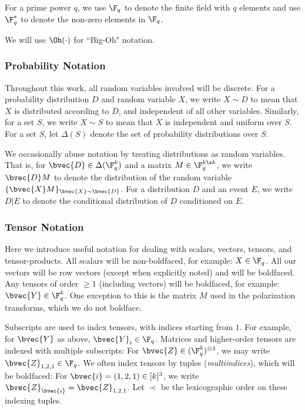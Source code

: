 \documentclass[11pt]{article}
\begin{document}
For a prime power $q$, we use $\F_q$ to denote the finite field with $q$ elements and use $\F_q^*$ to denote the non-zero elements in $\F_q$.

We will use $\Oh(\cdot)$ for ``Big-Oh" notation.

\subsubsection{Probability Notation}

Throughout this work, all random variables involved will be discrete.
For a probability distribution $D$ and random variable $X$, we write $X \sim D$ to mean that
$X$ is distributed according to $D$, and independent of all other variables.
Similarly, for a set $S$, we write $X \sim S$ to mean that $X$ is
independent and uniform over $S$.
For a set $S$, let $\Delta(S)$ denote the set of probability distributions over $S$.

We occasionally abuse notation by treating distributions as random variables.
That is, for $\bvec{D} \in \Delta(\F_q^k)$ and a matrix $M \in \F_q^{k \x k}$,
we write $\bvec{D}M$ to denote the distribution of the random variable
$\{\bvec{X}M\}_{\bvec{X} \sim \bvec{D}}$.
For a distribution $D$ and an event $E$, we write $D | E$ to denote the
conditional distribution of $D$ conditioned on $E$.

\subsubsection{Tensor Notation}
\label{sec:notation}
Here we introduce useful notation for dealing with scalars, vectors, tensors, and tensor-products.
All scalars will be non-boldfaced, for example: $X \in \F_q$.
All our vectors will be row vectors (except when explicitly noted) and will be boldfaced.
Any tensors of order $\geq 1$ (including vectors) will be boldfaced, for example: $\bvec{Y} \in \F_q^{k}$.
One exception to this is the matrix $M$ used in the polarization transforms,
which we do not boldface.

Subscripts are used to index tensors, with indices starting from $1$.
For example, for $\bvec{Y}$ as above, $\bvec{Y}_i \in \F_q$.
Matrices and higher-order tensors are indexed with multiple subscripts:
For $\bvec{Z} \in (\F_q^k)^{\otimes 3}$,
we may write $\bvec{Z}_{1, 2, 1} \in \F_q$.
We often index tensors by tuples (\emph{multiindices}), which will be boldfaced:
For $\bvec{i} = (1, 2, 1) \in [k]^3$, we write $\bvec{Z}_{\bvec{i}} = \bvec{Z}_{1, 2, 1}$.
Let $\prec$ be the lexicographic order on these indexing tuples.
\end{document}
